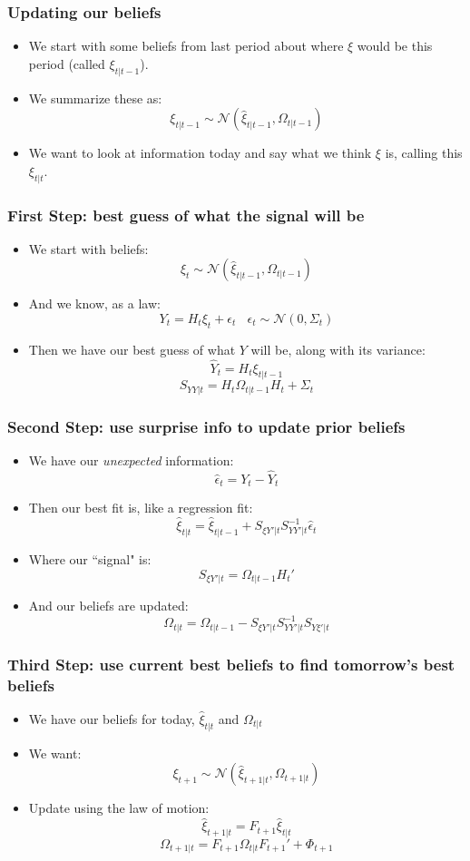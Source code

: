\documentclass{beamer}
\begin{document}
\begin{frame}
\frametitle[alignment=center]{Updating our beliefs}
\begin{itemize}
\item We start with some beliefs from last period about where $\xi$ would be this period (called $\xi_{t|t-1}$).
\bigskip
\item We summarize these as:
$$\xi_{t|t-1}\sim\mathcal{N}\left(\hat{\xi}_{t|t-1},\Omega_{t|t-1}\right)$$
\item We want to look at information today and say what we think $\xi$ is, calling this $\xi_{t|t}$.
\end{itemize}
\end{frame}

\begin{frame}
\frametitle[alignment=center]{First Step: best guess of what the signal will be}
\begin{itemize}
\item We start with beliefs:
$$\xi_t\sim\mathcal{N}\left(\hat{\xi}_{t|t-1},\Omega_{t|t-1}\right)$$
\item And we know, as a law:
$$Y_t=H_t\xi_t+\epsilon_t\ \ \ \ \epsilon_t\sim\mathcal{N}(0,\Sigma_t)$$
\item Then we have our best guess of what $Y$ will be, along with its variance:
$$\hat{Y}_t=H_t\xi_{t|t-1}$$
$$S_{YY|t}=H_t\Omega_{t|t-1}H_t+\Sigma_t$$
\end{itemize}
\end{frame}


\begin{frame}
\frametitle[alignment=center]{Second Step: use surprise info to update prior beliefs}
\begin{itemize}
\item We have our \emph{unexpected} information:
$$\hat{\epsilon}_t=Y_t-\hat{Y}_t$$
\item Then our best fit is, like a regression fit:
$$\hat{\xi}_{t|t}=\hat{\xi}_{t|t-1}+S_{\xi Y'|t}S_{YY'|t}^{-1}\hat{\epsilon}_t$$
\item Where our ``signal" is:
$$S_{\xi Y'|t}=\Omega_{t|t-1}H_t'$$
\item And our beliefs are updated:
$$\Omega_{t|t}=\Omega_{t|t-1}-S_{\xi Y'|t}S_{YY'|t}^{-1}S_{Y\xi'|t}$$
\end{itemize}
\end{frame}

\begin{frame}
\frametitle[alignment=center]{Third Step: use current best beliefs to find tomorrow's best beliefs}
\begin{itemize}
\item We have our beliefs for today, $\hat{\xi}_{t|t}$ and $\Omega_{t|t}$ 
\bigskip
\item We want:
$$\xi_{t+1}\sim\mathcal{N}(\hat{\xi}_{t+1|t},\Omega_{t+1|t})$$
\item Update using the law of motion:
$$\hat{\xi}_{t+1|t}=F_{t+1}\hat{\xi}_{t|t}$$
$$\Omega_{t+1|t}=F_{t+1}\Omega_{t|t}F_{t+1}'+\Phi_{t+1}$$
\end{itemize}
\end{frame}
\end{document}
